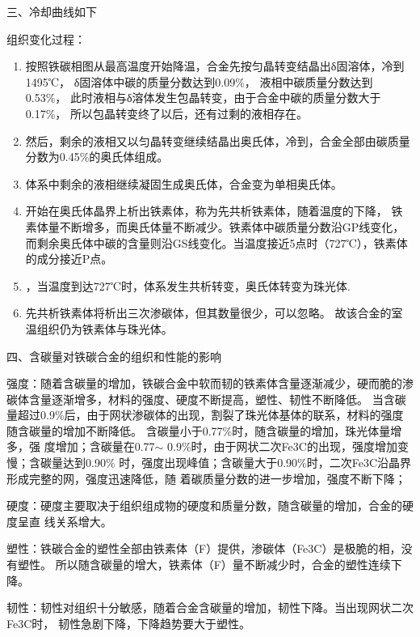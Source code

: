 \documentclass[a4paper,utf8]{article}
\begin{document}
三、冷却曲线如下

\begin{figure}[!ht]
    \begin{floatrow}
    \end{floatrow}

\end{figure}

组织变化过程：
    \begin{enumerate}
        \item 按照铁碳相图从最高温度开始降温，合金先按匀晶转变结晶出δ固溶体，冷到1495℃，
        δ固溶体中碳的质量分数达到0.09\%，
        液相中碳质量分数达到0.53\%，
        此时液相与δ溶体发生包晶转变，由于合金中碳的质量分数大于0.17\%，
        所以包晶转变终了以后，还有过剩的液相存在。
        \item 然后，剩余的液相又以匀晶转变继续结晶出奥氏体，冷到，合金全部由碳质量分数为0.45\%的奥氏体组成。
        \item 体系中剩余的液相继续凝固生成奥氏体，合金变为单相奥氏体。
        \item 开始在奥氏体晶界上析出铁素体，称为先共析铁素体，随着温度的下降，
        铁素体量不断增多，而奥氏体量不断减少。铁素体中碳质量分数沿GP线变化，
        而剩余奥氏体中碳的含量则沿GS线变化。当温度接近5点时（727℃），铁素体的成分接近P点。
        \item ，当温度到达727℃时，体系发生共析转变，奥氏体转变为珠光体.
        \item 先共析铁素体将析出三次渗碳体，但其数量很少，可以忽略。
        故该合金的室温组织仍为铁素体与珠光体。
    \end{enumerate}


四、含碳量对铁碳合金的组织和性能的影响

强度：随着含碳量的增加，铁碳合金中软而韧的铁素体含量逐渐减少，硬而脆的渗碳体含量逐渐增多，材料的强度、硬度不断提高，塑性、韧性不断降低。
当含碳量超过0.9\%后，由于网状渗碳体的出现，割裂了珠光体基体的联系，材料的强度随含碳量的增加不断降低。
含碳量小于0.77\%时，随含碳量的增加，珠光体量增多，强
度增加；含碳量在0.77$\sim$ 0.9\%时，由于网状二次Fe3C的出现，强度增加变慢；含碳量达到0.90\%
时，强度出现峰值；含碳量大于0.90\%时，二次Fe3C沿晶界形成完整的网，强度迅速降低，随
着碳质量分数的进一步增加，强度不断下降；

硬度：硬度主要取决于组织组成物的硬度和质量分数，随含碳量的增加，合金的硬度呈直
线关系增大。

塑性：铁碳合金的塑性全部由铁素体（F）提供，渗碳体（Fe3C）是极脆的相，没有塑性。
所以随含碳量的增大，铁素体（F）量不断减少时，合金的塑性连续下降。

韧性：韧性对组织十分敏感，随着合金含碳量的增加，韧性下降。当出现网状二次Fe3C时，
韧性急剧下降，下降趋势要大于塑性。
\end{document}
